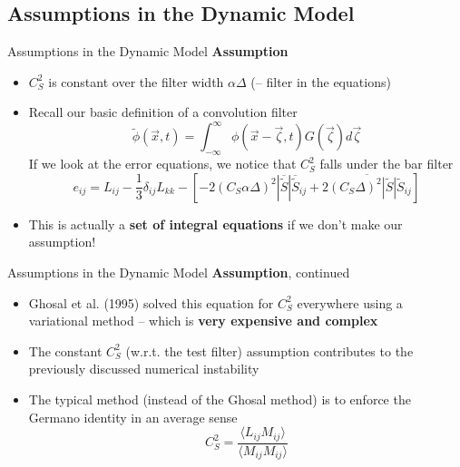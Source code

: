 \subsection{Assumptions in the Dynamic Model}
\begin{frame}{Assumptions in the Dynamic Model}
\textbf{ Assumption}
\begin{itemize}
	\item $C_S^2$ is constant over the filter width $\alpha\Delta$ (-- filter in the equations)
	\item Recall our basic definition of a convolution filter
	$$\tilde \phi (\vec{x},t) = \int_{-\infty}^{\infty} \phi (\vec{x} - \vec{\zeta},t) G(\vec{\zeta}) d \vec{\zeta}$$
	If we look at the error equations, we notice that $C_S^2$ falls under the bar filter
	$$e_{ij} = L_{ij} - \frac{1}{3}\delta_{ij}L_{kk}-\left[-2(C_S \alpha \Delta)^2\left|\overline{\widetilde{S}}\right|\overline{\widetilde{S}}_{ij} + \overline{2(C_S\Delta)^2\left|\widetilde{S}\right|\widetilde{S}_{ij}}\right]$$
	\item This is actually a \textbf{set of integral equations} if we don’t make our assumption!
\end{itemize}
\end{frame}

\begin{frame}{Assumptions in the Dynamic Model}
\textbf{ Assumption}, continued
\begin{itemize}
	\item  Ghosal et al. (1995) solved this equation for $C_S^2$ everywhere using a variational method -- which is \textbf{very expensive and complex}
	\item The constant $C_S^2$ (w.r.t. the test filter) assumption contributes to the previously discussed numerical instability
	\item The typical method (instead of the Ghosal method) is to enforce the Germano identity in an average sense
	$$\boxed{C_S^2 = \frac{\langle L_{ij}M_{ij}\rangle}{\langle M_{ij}M_{ij}\rangle}}$$
\end{itemize}
\end{frame}

